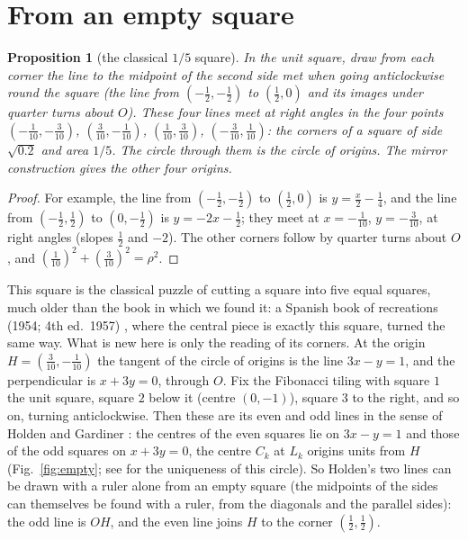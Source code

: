 \documentclass[11pt,a4paper]{article}
\theoremstyle{plain}
\newtheorem{proposition}[theorem]{Proposition}
\theoremstyle{definition}
\theoremstyle{remark}
\begin{document}
\section{From an empty square}
\begin{proposition}[the classical $1/5$ square]\label{prop:empty}
In the unit square, draw from each corner the line to the midpoint of the second side met when going anticlockwise round the square (the line from $(-\tfrac12,-\tfrac12)$ to $(\tfrac12,0)$ and its images under quarter turns about $O$). These four lines meet at right angles in the four points $(-\tfrac1{10},-\tfrac3{10})$, $(\tfrac3{10},-\tfrac1{10})$, $(\tfrac1{10},\tfrac3{10})$, $(-\tfrac3{10},\tfrac1{10})$: the corners of a square of side $\sqrt{0.2}$ and area $1/5$. The circle through them is the circle of origins. The mirror construction gives the other four origins.
\end{proposition}
\begin{proof}
For example, the line from $(-\tfrac12,-\tfrac12)$ to $(\tfrac12,0)$ is $y=\tfrac{x}{2}-\tfrac14$, and the line from $(-\tfrac12,\tfrac12)$ to $(0,-\tfrac12)$ is $y=-2x-\tfrac12$; they meet at $x=-\tfrac1{10}$, $y=-\tfrac3{10}$, at right angles (slopes $\tfrac12$ and $-2$). The other corners follow by quarter turns about $O$, and $(\tfrac1{10})^2+(\tfrac3{10})^2=\rho^2$.
\end{proof}
This square is the classical puzzle of cutting a square into five equal squares, much older than the book in which we found it: a Spanish book of recreations (1954; 4th ed.\ 1957) \cite{claraso}, where the central piece is exactly this square, turned the same way. What is new here is only the reading of its corners. At the origin $H=(\tfrac3{10},-\tfrac1{10})$ the tangent of the circle of origins is the line $3x-y=1$, and the perpendicular is $x+3y=0$, through $O$. Fix the Fibonacci tiling with square $1$ the unit square, square $2$ below it (centre $(0,-1)$), square $3$ to the right, and so on, turning anticlockwise. Then these are its even and odd lines in the sense of Holden \cite{holden} and Gardiner \cite{gardiner}: the centres of the even squares lie on $3x-y=1$ and those of the odd squares on $x+3y=0$, the centre $C_k$ at $L_k$ origins units from $H$ (Fig.~\ref{fig:empty}; see \cite{origins} for the uniqueness of this circle). So Holden's two lines can be drawn with a ruler alone from an empty square (the midpoints of the sides can themselves be found with a ruler, from the diagonals and the parallel sides): the odd line is $OH$, and the even line joins $H$ to the corner $(\tfrac12,\tfrac12)$.
\end{document}
